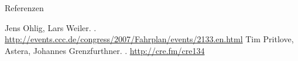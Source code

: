 \documentclass[hyperref={pdfpagelabels=false}]{beamer}
\begin{document}
\begin{frame}{Referenzen}
    \begin{thebibliography}{XX}
        \beamertemplatetextbibitems
            Jens Ohlig, Lars Weiler.
            .
            \footnotesize
            \newblock \url{http://events.ccc.de/congress/2007/Fahrplan/events/2133.en.html}
            \normalsize
            Tim Pritlove, Astera, Johannes Grenzfurthner.
            .
            \newblock \url{http://cre.fm/cre134}
    \end{thebibliography}
\end{frame}
\end{document}
